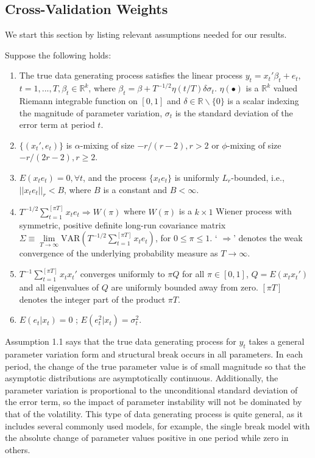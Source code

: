 \subsection{Cross-Validation Weights}
We start this section by listing relevant assumptions needed for our results.
\begin{assumption}\label{asump:1}
Suppose the following holds:
	\begin{enumerate}
		\item The true data generating process satisfies the linear process $y_t = x_t'\beta_t + e_t$, $t=1,...,T,\beta_t \in \mathbb{R}^k$, where $\beta_t = \beta + T^{-1/2}\eta(t/T)\delta\sigma_t$. $\eta(\bullet)$ is a $\mathbb{R}^k$ valued Riemann integrable function on $[0,1]$ and $\delta \in \mathbb{R}\backslash\{0\}$ is a scalar indexing the magnitude of parameter variation, $\sigma_{t}$ is the standard deviation of the error term at period $t$.
		\item $\{(x_t',e_t)\}$ is $\alpha$-mixing of size $-r/(r-2),r > 2$ or $\phi$-mixing of size $-r/(2r-2),r \geq 2$.
	    \item $E(x_t e_t) = 0, \forall t$, and the process $\{x_t e_t\}$ is uniformly $L_r$-bounded, i.e., $||x_t e_t||_{r} < B$, where $B$ is a constant and $B < \infty$.
	    \item $T^{-1/2}\sum_{t=1}^{[\pi T]} x_t e_t \Rightarrow W(\pi)$ where $W(\pi)$ is a $k \times 1$ Wiener process with symmetric, positive definite long-run covariance matrix $\Sigma \equiv \lim\limits_{T\to \infty}\mathrm{VAR}(T^{-1/2}\sum_{t=1}^{[\pi T]} x_t e_t)$, for $0 \leq \pi \leq 1$. ` $\Rightarrow$' denotes the weak convergence of the underlying probability measure as $T \to \infty$.
		\item $T^{-1}\sum_{t=1}^{[\pi T]}x_t x_t'$ converges uniformly to $\pi Q$ for all $\pi \in [0,1]$, $Q = E(x_t x_t')$ and all eigenvalues of $Q$ are uniformly bounded away from zero. $[\pi T]$ denotes the integer part of the product $\pi T$.
		\item $E(e_t|x_t) = 0$ ; $E(e_t^{2}|x_t) = \sigma_t^{2}$.
	\end{enumerate}
\end{assumption}
Assumption 1.1 says that the true data generating process for $y_t$ takes a general parameter variation form and structural break occurs in all parameters. In each period, the change of the true parameter value is of small magnitude so that the asymptotic distributions are asymptotically continuous. Additionally, the parameter variation is proportional to the unconditional standard deviation of the error term, so the impact of parameter instability will not be dominated by that of the volatility. This type of data generating process is quite general, as it includes several commonly used models, for example, the single break model with the absolute change of parameter values positive in one period while zero in others.

